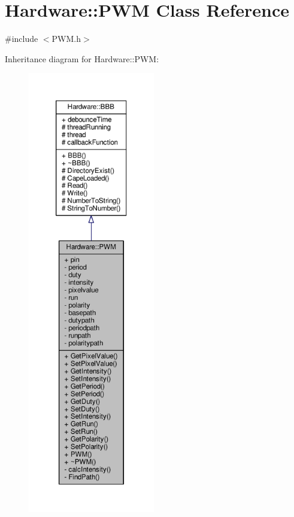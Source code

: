 \hypertarget{class_hardware_1_1_p_w_m}{}\section{Hardware\+:\+:P\+W\+M Class Reference}
\label{class_hardware_1_1_p_w_m}


{\ttfamily \#include $<$P\+W\+M.\+h$>$}



Inheritance diagram for Hardware\+:\+:P\+W\+M\+:\nopagebreak
\begin{figure}[H]
\begin{center}
\leavevmode
\includegraphics[height=550pt]{class_hardware_1_1_p_w_m__inherit__graph}
\end{center}
\end{figure}


